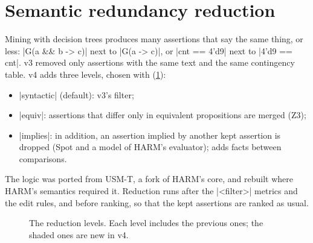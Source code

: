 \section{Semantic redundancy reduction}\label{sec:reduction}
Mining with decision trees produces many assertions that say the same thing, or less: \code|G({a && b} -> c)| next to \code|G(a -> c)|, or \code|cnt == 4'd9| next to \code|4'd9 == cnt|. v3 removed only assertions with the same text and the same contingency table. v4 adds three levels, chosen with  (\cref{fig:reduction}):
\begin{itemize}
\item \code|syntactic| (default): v3's filter;
\item \code|equiv|: assertions that differ only in equivalent propositions are merged (Z3);
\item \code|implies|: in addition, an assertion implied by another kept assertion is dropped (Spot and a model of HARM's evaluator);  adds facts between comparisons.
\end{itemize}
The logic was ported from USM-T, a fork of HARM's core, and rebuilt where HARM's semantics required it. Reduction runs after the \code|<filter>| metrics and the edit rules, and before ranking, so that the kept assertions are ranked as usual.

\begin{figure}[t]
\centering
{}
\caption{The reduction levels. Each level includes the previous ones; the shaded ones are new in v4.}
\label{fig:reduction}
\end{figure}


